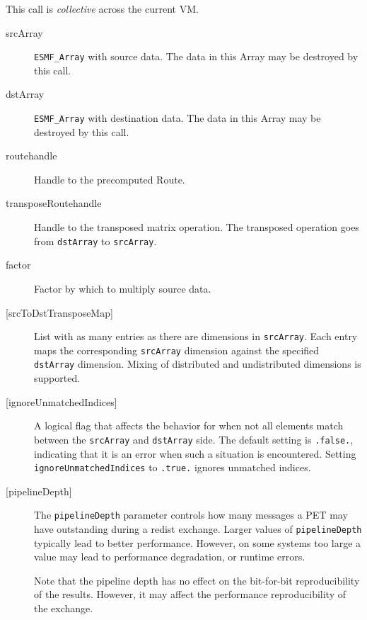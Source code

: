    This call is {\em collective} across the current VM.  
  
     \begin{description}
  
     \item [srcArray]
       {\tt ESMF\_Array} with source data. The data in this Array may be
       destroyed by this call.
  
     \item [dstArray]
       {\tt ESMF\_Array} with destination data. The data in this Array may be
       destroyed by this call.
  
     \item [routehandle]
       Handle to the precomputed Route.
  
     \item [transposeRoutehandle]
       Handle to the transposed matrix operation. The transposed operation goes
       from {\tt dstArray} to {\tt srcArray}.
  
     \item [factor]
       Factor by which to multiply source data.
  
     \item [{[srcToDstTransposeMap]}]
       List with as many entries as there are dimensions in {\tt srcArray}. Each
       entry maps the corresponding {\tt srcArray} dimension against the 
       specified {\tt dstArray} dimension. Mixing of distributed and
       undistributed dimensions is supported.
  
     \item [{[ignoreUnmatchedIndices]}]
       A logical flag that affects the behavior for when not all elements match
       between the {\tt srcArray} and {\tt dstArray} side. The default setting
       is {\tt .false.}, indicating that it is an error when such a situation is 
       encountered. Setting {\tt ignoreUnmatchedIndices} to {\tt .true.} ignores
       unmatched indices.
  
     \item [{[pipelineDepth]}]
       The {\tt pipelineDepth} parameter controls how many messages a PET
       may have outstanding during a redist exchange. Larger values
       of {\tt pipelineDepth} typically lead to better performance. However,
       on some systems too large a value may lead to performance degradation,
       or runtime errors.
  
       Note that the pipeline depth has no effect on the bit-for-bit
       reproducibility of the results. However, it may affect the performance
       reproducibility of the exchange.
  

\end{description}
